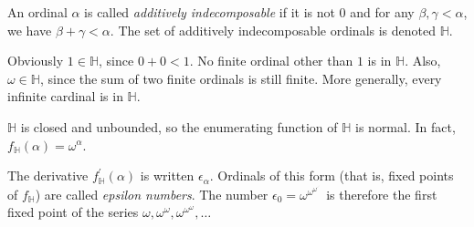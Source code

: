 \documentclass[12pt]{article}
\def\indecomp{\mathbb{H}}
\begin{document}
An ordinal $\alpha$ is called \emph{additively indecomposable} if it is not $0$ and for any $\beta,\gamma<\alpha$, we have $\beta+\gamma<\alpha$.
The set of additively indecomposable ordinals is denoted $\indecomp$.

Obviously $1\in\indecomp$, since $0+0<1$. 
No finite ordinal other than $1$ is in $\indecomp$.
Also, $\omega\in\indecomp$, since the sum of two finite ordinals is still finite.
More generally, every infinite cardinal is in $\indecomp$.

$\indecomp$ is closed and unbounded, so the enumerating function of $\indecomp$ is normal.
In fact, $f_\indecomp(\alpha)=\omega^\alpha$.

The derivative $f_\indecomp^\prime(\alpha)$ is written $\epsilon_\alpha$.
Ordinals of this form (that is, fixed points of $f_\indecomp$) are called \emph{epsilon numbers}.
The number $\epsilon_0=\omega^{\omega^{\omega^{\cdot^{\cdot^\cdot}}}}$ is therefore the first fixed point of the series 
$\omega,\omega^\omega\!,\omega^{\omega^\omega}\!\!,\ldots$
\end{document}
